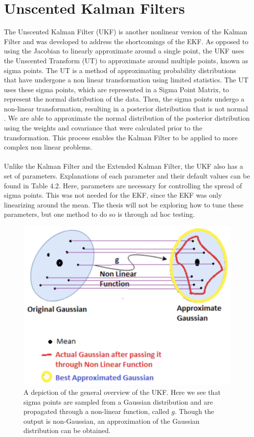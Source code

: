 \chapter{Unscented Kalman Filters}
\label{Unscented Kalman Filters}

The Unscented Kalman Filter (UKF) is another nonlinear version of the Kalman Filter and was developed to address the shortcomings of the EKF. As opposed to using the Jacobian to linearly approximate around a single point, the UKF uses the Unscented Transform (UT) to approximate around multiple points, known as sigma points. The UT is a method of approximating probability distributions that have undergone a non linear transformation using limited statistics. The UT uses these sigma points, which are represented in a Sigma Point Matrix, to represent the normal distribution of the data. Then, the sigma points undergo a non-linear transformation, resulting in a posterior distribution that is not normal \cite{inbook, Wan01theunscented} . We are able to approximate the normal distribution of the posterior distribution using the weights and covariance that were calculated prior to the transformation. This process enables the Kalman Filter to be applied to more complex non linear problems. \\ \\

\noindent Unlike the Kalman Filter and the Extended Kalman Filter, the UKF also has a set of parameters. Explanations of each parameter and their default values can be found in Table 4.2. Here, parameters are necessary for controlling the spread of sigma points. This was not needed for the EKF, since the EKF was only linearizing around the mean. The thesis will not be exploring how to tune these parameters, but one method to do so is through ad hoc testing.

\begin{figure}[h]
    \centering
    \includegraphics[scale = 0.7]{UKF.png}
    \caption{A depiction of the general overview of the UKF. Here we see that sigma points are sampled from a Gaussian distribution and are propagated through a non-linear function, called $g$. Though the output is non-Gaussian, an approximation of the Gaussian distribution can be obtained.}
\end{figure}

